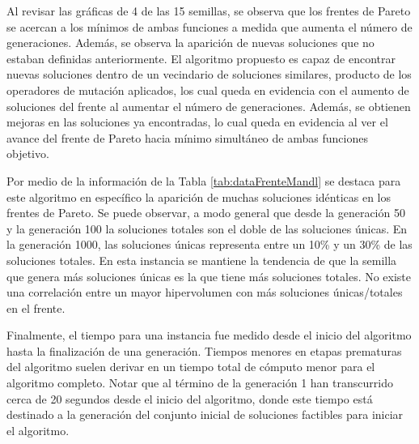 Al revisar las gráficas de 4 de las 15 semillas, se observa que los frentes de Pareto se acercan a los mínimos de ambas funciones a medida que aumenta el número de generaciones. Además, se observa la aparición de nuevas soluciones que no estaban definidas anteriormente. El algoritmo propuesto es capaz de encontrar nuevas soluciones dentro de un vecindario de soluciones similares, producto de los operadores de mutación aplicados, los cual queda en evidencia con el aumento de soluciones del frente al aumentar el número de generaciones. Además, se obtienen mejoras en las soluciones ya encontradas, lo cual queda en evidencia al ver el avance del frente de Pareto hacia mínimo simultáneo de ambas funciones objetivo.

Por medio de la información de la Tabla \ref{tab:dataFrenteMandl} se destaca para este algoritmo en específico la aparición de muchas soluciones idénticas en los frentes de Pareto. Se puede observar, a modo general que desde la generación 50 y la generación 100 la soluciones totales son el doble de las soluciones únicas. En la generación 1000, las soluciones únicas representa entre un 10\% y un 30\% de las soluciones totales. En esta instancia se mantiene la tendencia de que la semilla que genera más soluciones únicas es la que tiene más soluciones totales. No existe una correlación entre un mayor hipervolumen con más soluciones únicas/totales en el frente. 

Finalmente, el tiempo para una instancia fue medido desde el inicio del algoritmo hasta la finalización de una generación. Tiempos menores en etapas prematuras del algoritmo suelen derivar en un tiempo total de cómputo menor para el algoritmo completo. Notar que al término de la generación 1 han transcurrido cerca de 20 segundos desde el inicio del algoritmo, donde este tiempo está destinado a la generación del conjunto inicial de soluciones factibles para iniciar el algoritmo.


